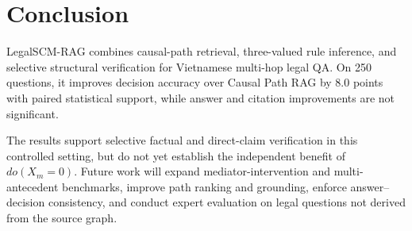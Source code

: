 \section{Conclusion}
\label{sec:conclusion}

LegalSCM-RAG combines causal-path retrieval, three-valued rule inference, and
selective structural verification for Vietnamese multi-hop legal QA. On 250
questions, it improves decision accuracy over Causal Path RAG by 8.0 points
with paired statistical support, while answer and citation improvements are
not significant.

The results support selective factual and direct-claim verification in this
controlled setting, but do not yet establish the independent benefit of
$do(X_m=0)$. Future work will expand mediator-intervention and
multi-antecedent benchmarks, improve path ranking and grounding, enforce
answer--decision consistency, and conduct expert evaluation on legal questions
not derived from the source graph.

